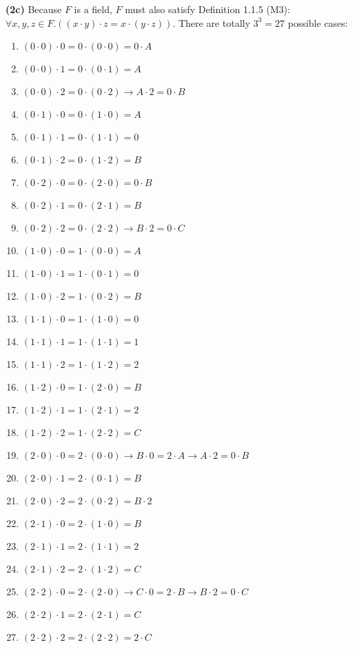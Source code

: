 \documentclass[12pt, letterpaper, oneside]{book}
\begin{document}
\textbf{(2c)} Because $F$ is a field, $F$ must also satisfy Definition 1.1.5 (M3): $\forall x, y, z \in F. ((x \cdot y)
  \cdot z = x \cdot (y \cdot z))$. There are totally $3^3 = 27$ possible cases:
\begin{enumerate}
  \item $(0 \cdot 0) \cdot 0 = 0 \cdot (0 \cdot 0) = 0 \cdot A$
  \item $(0 \cdot 0) \cdot 1 = 0 \cdot (0 \cdot 1) = A$
  \item $(0 \cdot 0) \cdot 2 = 0 \cdot (0 \cdot 2) \rightarrow A \cdot 2 = 0 \cdot B$
  \item $(0 \cdot 1) \cdot 0 = 0 \cdot (1 \cdot 0) = A$
  \item $(0 \cdot 1) \cdot 1 = 0 \cdot (1 \cdot 1) = 0$
  \item $(0 \cdot 1) \cdot 2 = 0 \cdot (1 \cdot 2) = B$
  \item $(0 \cdot 2) \cdot 0 = 0 \cdot (2 \cdot 0) = 0 \cdot B$
  \item $(0 \cdot 2) \cdot 1 = 0 \cdot (2 \cdot 1) = B$
  \item $(0 \cdot 2) \cdot 2 = 0 \cdot (2 \cdot 2) \rightarrow B \cdot 2 = 0 \cdot C$
  \item $(1 \cdot 0) \cdot 0 = 1 \cdot (0 \cdot 0) = A$
  \item $(1 \cdot 0) \cdot 1 = 1 \cdot (0 \cdot 1) = 0$
  \item $(1 \cdot 0) \cdot 2 = 1 \cdot (0 \cdot 2) = B$
  \item $(1 \cdot 1) \cdot 0 = 1 \cdot (1 \cdot 0) = 0$
  \item $(1 \cdot 1) \cdot 1 = 1 \cdot (1 \cdot 1) = 1$
  \item $(1 \cdot 1) \cdot 2 = 1 \cdot (1 \cdot 2) = 2$
  \item $(1 \cdot 2) \cdot 0 = 1 \cdot (2 \cdot 0) = B$
  \item $(1 \cdot 2) \cdot 1 = 1 \cdot (2 \cdot 1) = 2$
  \item $(1 \cdot 2) \cdot 2 = 1 \cdot (2 \cdot 2) = C$
  \item $(2 \cdot 0) \cdot 0 = 2 \cdot (0 \cdot 0) \rightarrow B \cdot 0 = 2 \cdot A \rightarrow A \cdot 2 = 0 \cdot B$
  \item $(2 \cdot 0) \cdot 1 = 2 \cdot (0 \cdot 1) = B$
  \item $(2 \cdot 0) \cdot 2 = 2 \cdot (0 \cdot 2) = B \cdot 2$
  \item $(2 \cdot 1) \cdot 0 = 2 \cdot (1 \cdot 0) = B$
  \item $(2 \cdot 1) \cdot 1 = 2 \cdot (1 \cdot 1) = 2$
  \item $(2 \cdot 1) \cdot 2 = 2 \cdot (1 \cdot 2) = C$
  \item $(2 \cdot 2) \cdot 0 = 2 \cdot (2 \cdot 0) \rightarrow C \cdot 0 = 2 \cdot B \rightarrow B \cdot 2 = 0 \cdot C$
  \item $(2 \cdot 2) \cdot 1 = 2 \cdot (2 \cdot 1) = C$
  \item $(2 \cdot 2) \cdot 2 = 2 \cdot (2 \cdot 2) = 2 \cdot C$
\end{enumerate}
\end{document}
